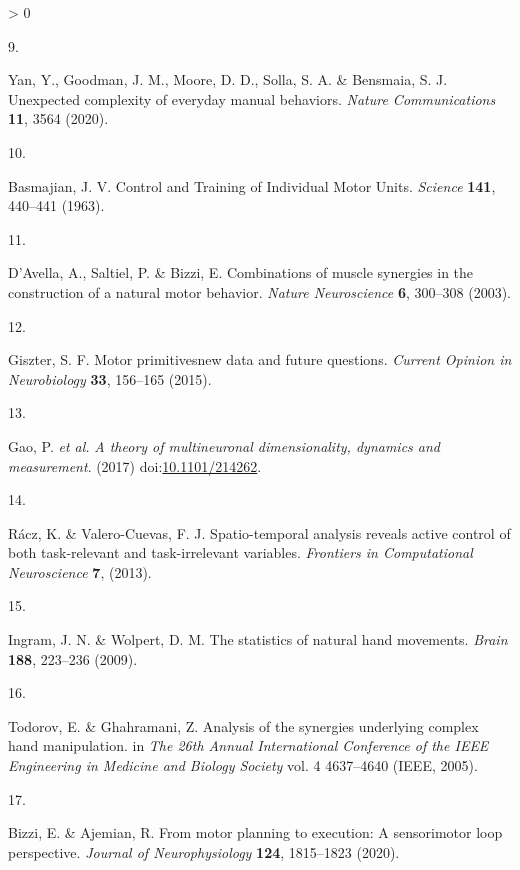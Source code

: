 \documentclass[
  a4paper,
]{article}
\newlength{\cslhangindent}
\newlength{\csllabelwidth}
\newenvironment{CSLReferences}[2] %
 {%
  \setlength{\parindent}{0pt}
  \ifodd #1 \everypar{\setlength{\hangindent}{\cslhangindent}}\ignorespaces\fi
  \ifnum #2 > 0
  \setlength{\parskip}{#2\baselineskip}
  \fi
 }%
 {}
\newcommand{\CSLLeftMargin}[1]{\parbox[t]{\csllabelwidth}{#1}}
\newcommand{\CSLRightInline}[1]{\parbox[t]{\linewidth - \csllabelwidth}{#1}\break}
\begin{document}
\begin{CSLReferences}{0}{0}
\leavevmode\hypertarget{ref-yanUnexpectedComplexityEveryday2020}{}%
\CSLLeftMargin{9. }
\CSLRightInline{Yan, Y., Goodman, J. M., Moore, D. D., Solla, S. A. \&
Bensmaia, S. J. Unexpected complexity of everyday manual behaviors.
\emph{Nature Communications} \textbf{11}, 3564 (2020).}

\leavevmode\hypertarget{ref-Basmajian1963}{}%
\CSLLeftMargin{10. }
\CSLRightInline{Basmajian, J. V. Control and {Training} of {Individual
Motor Units}. \emph{Science} \textbf{141}, 440--441 (1963).}

\leavevmode\hypertarget{ref-DAvella2003}{}%
\CSLLeftMargin{11. }
\CSLRightInline{D'Avella, A., Saltiel, P. \& Bizzi, E. Combinations of
muscle synergies in the construction of a natural motor behavior.
\emph{Nature Neuroscience} \textbf{6}, 300--308 (2003).}

\leavevmode\hypertarget{ref-giszterMotorPrimitivesNew2015}{}%
\CSLLeftMargin{12. }
\CSLRightInline{Giszter, S. F. Motor primitives{}new data and future
questions. \emph{Current Opinion in Neurobiology} \textbf{33}, 156--165
(2015).}

\leavevmode\hypertarget{ref-gao2017}{}%
\CSLLeftMargin{13. }
\CSLRightInline{Gao, P. \emph{et al.} \emph{A theory of multineuronal
dimensionality, dynamics and measurement}. (2017)
doi:\href{https://doi.org/10.1101/214262}{10.1101/214262}.}

\leavevmode\hypertarget{ref-raczSpatiotemporalAnalysisReveals2013}{}%
\CSLLeftMargin{14. }
\CSLRightInline{Rácz, K. \& Valero-Cuevas, F. J. Spatio-temporal
analysis reveals active control of both task-relevant and
task-irrelevant variables. \emph{Frontiers in Computational
Neuroscience} \textbf{7}, (2013).}

\leavevmode\hypertarget{ref-Ingram2009}{}%
\CSLLeftMargin{15. }
\CSLRightInline{Ingram, J. N. \& Wolpert, D. M. The statistics of
natural hand movements. \emph{Brain} \textbf{188}, 223--236 (2009).}

\leavevmode\hypertarget{ref-TodorovDimensionality2005}{}%
\CSLLeftMargin{16. }
\CSLRightInline{Todorov, E. \& Ghahramani, Z. Analysis of the synergies
underlying complex hand manipulation. in \emph{The 26th {Annual
International Conference} of the {IEEE Engineering} in {Medicine} and
{Biology Society}} vol. 4 4637--4640 ({IEEE}, 2005).}

\leavevmode\hypertarget{ref-bizziMotorPlanningExecution2020}{}%
\CSLLeftMargin{17. }
\CSLRightInline{Bizzi, E. \& Ajemian, R. From motor planning to
execution: A sensorimotor loop perspective. \emph{Journal of
Neurophysiology} \textbf{124}, 1815--1823 (2020).}


\end{CSLReferences}
\end{document}
